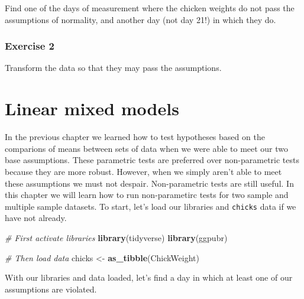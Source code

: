 \documentclass[english,10pt,a4paper,oneside]{book}
\newenvironment{Shaded}{\begin{snugshade}}{\end{snugshade}}
\newcommand{\CommentTok}[1]{\textcolor[rgb]{0.56,0.35,0.01}{\textit{#1}}}
\newcommand{\DataTypeTok}[1]{\textcolor[rgb]{0.13,0.29,0.53}{#1}}
\newcommand{\DecValTok}[1]{\textcolor[rgb]{0.00,0.00,0.81}{#1}}
\newcommand{\KeywordTok}[1]{\textcolor[rgb]{0.13,0.29,0.53}{\textbf{#1}}}
\newcommand{\NormalTok}[1]{#1}
\newcommand{\OperatorTok}[1]{\textcolor[rgb]{0.81,0.36,0.00}{\textbf{#1}}}
\newcommand{\StringTok}[1]{\textcolor[rgb]{0.31,0.60,0.02}{#1}}
\theoremstyle{definition}
\theoremstyle{definition}
\theoremstyle{definition}
\theoremstyle{remark}
\begin{document}
Find one of the days of measurement where the chicken weights do not
pass the assumptions of normality, and another day (not day 21!) in
which they do.

\hypertarget{exercise-2-2}{%
\subsection{Exercise 2}\label{exercise-2-2}}

Transform the data so that they may pass the assumptions.

\hypertarget{linear-mixed-models}{%
\chapter{Linear mixed models}\label{linear-mixed-models}}

In the previous chapter we learned how to test hypotheses based on the
comparions of means between sets of data when we were able to meet our
two base assumptions. These parametric tests are preferred over
non-parametric tests because they are more robust. However, when we
simply aren't able to meet these assumptions we must not despair.
Non-parametric tests are still useful. In this chapter we will learn how
to run non-parametirc tests for two sample and multiple sample datasets.
To start, let's load our libraries and \texttt{chicks} data if we have
not already.

\begin{Shaded}
\begin{Highlighting}[]
\CommentTok{# First activate libraries}
\KeywordTok{library}\NormalTok{(tidyverse)}
\KeywordTok{library}\NormalTok{(ggpubr)}

\CommentTok{# Then load data}
\NormalTok{chicks <-}\StringTok{ }\KeywordTok{as_tibble}\NormalTok{(ChickWeight)}
\end{Highlighting}
\end{Shaded}

With our libraries and data loaded, let's find a day in which at least
one of our assumptions are violated.

\begin{Shaded}
\end{Shaded}
\end{document}
